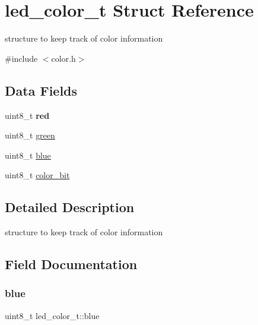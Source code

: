 \hypertarget{structled__color__t}{}\section{led\+\_\+color\+\_\+t Struct Reference}
\label{structled__color__t}


structure to keep track of color information  




{\ttfamily \#include $<$color.\+h$>$}

\subsection*{Data Fields}
\begin{DoxyCompactItemize}
\item 
\hypertarget{structled__color__t_a8be2460d49ee888ca41960ec6af7a847}{}\label{structled__color__t_a8be2460d49ee888ca41960ec6af7a847} 
uint8\+\_\+t {\bfseries red}
\item 
uint8\+\_\+t \hyperlink{structled__color__t_a6de2ea48f79a402a8ca9539aef558446}{green}
\item 
uint8\+\_\+t \hyperlink{structled__color__t_a983cc1c27beb103d247f3271bc27bea4}{blue}
\item 
uint8\+\_\+t \hyperlink{structled__color__t_aec0d31c9fec35cc5ca2561f7458f2036}{color\+\_\+bit}
\end{DoxyCompactItemize}


\subsection{Detailed Description}
structure to keep track of color information 

\subsection{Field Documentation}
\hypertarget{structled__color__t_a983cc1c27beb103d247f3271bc27bea4}{}\label{structled__color__t_a983cc1c27beb103d247f3271bc27bea4} 
\subsubsection{\texorpdfstring{blue}{blue}}
{\footnotesize\ttfamily uint8\+\_\+t led\+\_\+color\+\_\+t\+::blue}

